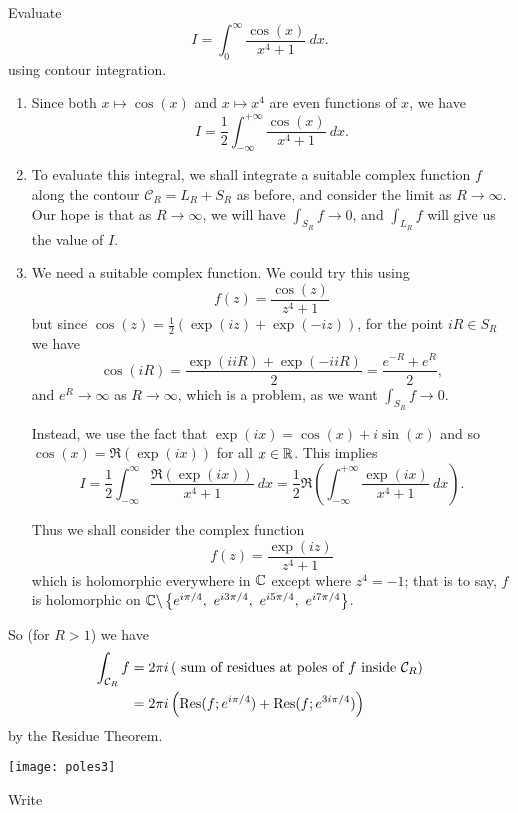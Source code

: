 \begin{example}
Evaluate
\[
I = \int_0^{\infty} \frac{\cos(x)}{x^4+1}\ dx.
\]
using contour integration.
\end{example}
\begin{enumerate}
\item Since both $x \mapsto \cos (x)$ and $x \mapsto x^4$ are even functions of $x$, we have
\[
I = \frac{1}{2} \int_{-\infty}^{+\infty} \frac{\cos(x)}{x^4+1}\ dx.
\]
\item To evaluate this integral, we shall integrate a suitable complex function $f$ along the contour $\mathcal{C}_R=L_R+S_R$ as before, and consider the limit as $R \to \infty$.  Our hope is that as $R \to \infty$, we will have $\int_{S_R} f \to 0$, and $\int_{L_R} f$ will give us the value of $I$.

\item We need a suitable complex function.  We could try this using
\[
f(z) = \frac{\cos (z)}{z^4+1}
\]
but since $\cos(z) =\frac{1}{2} (\exp(iz)+\exp(-iz))$, for the point $iR \in S_R$ we have
\[
\cos(iR) = \frac{\exp(iiR)+\exp(-iiR)}{2} = \frac{e^{-R}+e^R}{2},
\]
and $e^R \to \infty$ as $R \to \infty$, which is a problem, as we want $\int_{S_R} f \to 0$.

Instead, we use the fact that
$
\exp (ix) = \cos (x) + i \sin (x)
$ and so $\cos(x) = \Re (\exp(ix))$ for all $x \in \mathbb{R}$. This implies
\[
I = \frac{1}{2} \int_{-\infty}^{\infty} \frac{\Re ( \exp(ix) )}{x^4 +1}\ dx = \frac{1}{2} \Re \left( \int_{-\infty}^{+\infty} \frac{\exp(ix)}{x^4+1}\ dx \right).
\]

Thus we shall consider the complex function
\[
f(z) = \frac{\exp(iz)}{z^4+1}
\]
which is holomorphic everywhere in $\mathbb{C}$ except where $z^4=-1$; that is to say, $f$ is holomorphic on $\mathbb{C} \backslash \left\{ e^{i\pi/4},\ e^{i3\pi/4},\ e^{i 5\pi/4},\ e^{i 7\pi/4} \right\}$.
\end{enumerate}
So (for $R>1$) we have
\begin{align*}
\int_{\mathcal{C}_R} f &= 2\pi i \left( \text{ sum of residues at poles of $f$ inside $\mathcal{C}_R$} \right) \\
& = 2\pi i \left( \mathrm{Res} (f;e^{i\pi/4})+\mathrm{Res}(f;e^{3i\pi/4}) \right)
\end{align*}
by the Residue Theorem.
\begin{center}
\texttt{[image: poles3]}
\end{center}
Write
